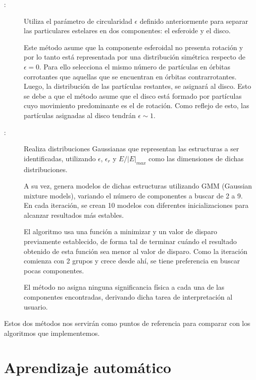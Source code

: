 \begin{description}
    \item[\citet{abadi2003simulations}:]

Utiliza el parámetro de circularidad $\epsilon$ definido anteriormente para separar las particulares estelares en dos componentes: el esferoide y el disco.

Este método asume que la componente esferoidal no presenta rotación y por lo tanto está representada por una distribución simétrica respecto de $\epsilon = 0$. Para ello selecciona el mismo número de partículas en órbitas corrotantes que aquellas que se encuentran en órbitas contrarrotantes. Luego, la distribución de las partículas restantes, se asignará al disco. Esto se debe a que el método asume que el disco está formado por partículas cuyo movimiento predominante es el de rotación. Como reflejo de esto, las partículas asignadas al disco tendrán $\epsilon \sim 1$.
    
    \item[\citet{du2019identifying}:] 

Realiza distribuciones Gaussianas que representan las estructuras a ser identificadas, utilizando $\epsilon$, $\epsilon_r$ y $E/|E|_{max}$ como las dimensiones de dichas distribuciones.

A su vez, genera modelos de dichas estructuras utilizando GMM (Gaussian mixture models), variando el número de componentes a buscar de 2 a 9. En cada iteración, se crean 10 modelos con diferentes inicializaciones para alcanzar resultados más estables.

El algoritmo usa una función a minimizar y un valor de disparo previamente establecido, de forma tal de terminar cuándo el resultado obtenido de esta función sea menor al valor de disparo. Como la iteración comienza con 2 grupos y crece desde ahí, se tiene preferencia en buscar pocas componentes.

El método no asigna ninguna significancia física a cada una de las componentes encontradas, derivando dicha tarea de interpretación al usuario.
    
\end{description}

Estos dos métodos nos servirán como puntos de referencia para comparar con los algoritmos que implementemos.

\section{Aprendizaje automático}

